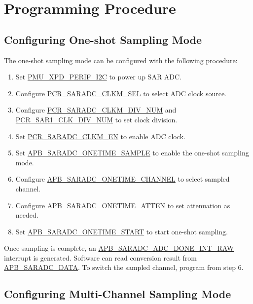 \documentclass[main\_\_EN.tex]{subfiles}
\begin{document}
\section{Programming Procedure}

\subsection{Configuring One-shot Sampling Mode}

The one-shot sampling mode can be configured with the following procedure:

\begin{enumerate}
    \item Set \hyperref[fielddesc:PMUXPDPERIFI2C]{PMU\_XPD\_PERIF\_I2C} to power up SAR ADC.
    \item Configure \hyperref[fielddesc:PCRSARADCCLKMSEL]{PCR\_SARADC\_CLKM\_SEL} to select ADC clock source.
    \item Configure \hyperref[fielddesc:PCRSARADCCLKMDIVNUM]{PCR\_SARADC\_CLKM\_DIV\_NUM} and \hyperref[fielddesc:PCRSAR1CLKDIVNUM]{PCR\_SAR1\_CLK\_DIV\_NUM} to set clock division.
    \item Set \hyperref[fielddesc:PCRSARADCCLKMEN]{PCR\_SARADC\_CLKM\_EN} to enable ADC clock.
    \item Set \hyperref[fielddesc:APBSARADCONETIMESAMPLE]{APB\_SARADC\_ONETIME\_SAMPLE} to enable the one-shot sampling mode.
    \item Configure \hyperref[fielddesc:APBSARADCONETIMECHANNEL]{APB\_SARADC\_ONETIME\_CHANNEL} to select sampled channel.
    \item Configure \hyperref[fielddesc:APBSARADCONETIMEATTEN]{APB\_SARADC\_ONETIME\_ATTEN} to set attenuation as needed.
    \item Set \hyperref[fielddesc:APBSARADCONETIMESTART]{APB\_SARADC\_ONETIME\_START} to start one-shot sampling.
\end{enumerate}

Once sampling is complete, an \hyperref[fielddesc:APBSARADCDONEINTRAW]{APB\_SARADC\_ADC\_DONE\_INT\_RAW} interrupt is generated. Software can read conversion result from \hyperref[fielddesc:APBSARADCDATA]{APB\_SARADC\_DATA}. To switch the sampled channel, program from step 6.

\subsection{Configuring Multi-Channel Sampling Mode}
\end{document}
